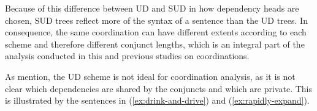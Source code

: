 
Because of this difference between UD and SUD in how dependency heads are chosen, SUD trees reflect more of the syntax of a sentence than the UD trees. In consequence, the same coordination can have different extents according to each scheme and therefore different conjunct lengths, which is an integral part of the analysis conducted in this and previous studies on coordinations. 

As \cite{prz:woz:23} mention, the UD scheme is not ideal for coordination analysis, as it is not clear which dependencies are shared by the conjuncts and which are private. This is illustrated by the sentences in (\ref{ex:drink-and-drive}) and (\ref{ex:rapidly-expand}).

\vspace{2ex}
\hspace{-2.3em}
\vspace{2ex}

